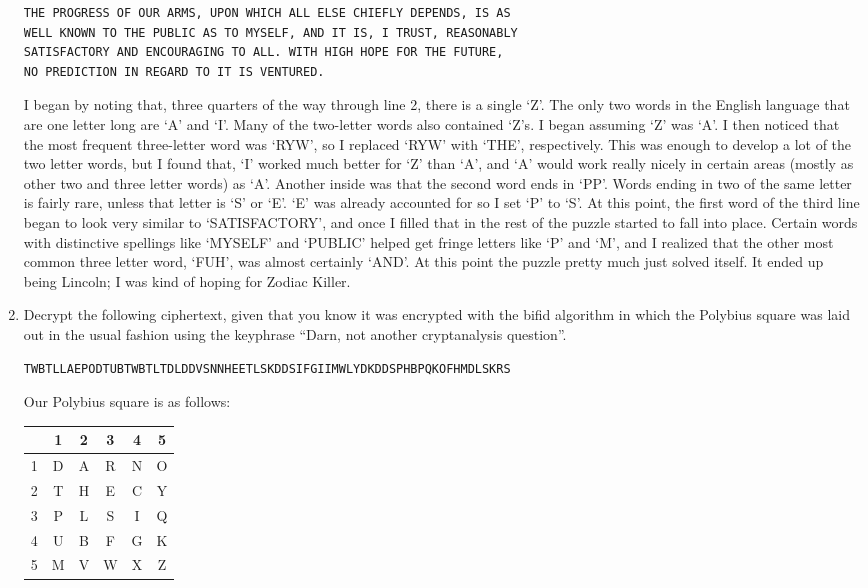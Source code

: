\documentclass[a4paper,12pt]{article}
\begin{document}
\begin{enumerate}
\begin{verbatim}
THE PROGRESS OF OUR ARMS, UPON WHICH ALL ELSE CHIEFLY DEPENDS, IS AS
WELL KNOWN TO THE PUBLIC AS TO MYSELF, AND IT IS, I TRUST, REASONABLY
SATISFACTORY AND ENCOURAGING TO ALL. WITH HIGH HOPE FOR THE FUTURE, 
NO PREDICTION IN REGARD TO IT IS VENTURED.
\end{verbatim}

I began by noting that, three quarters of the way through line 2, there is a single `Z'. The only two words in the English language that are one letter long are `A' and `I'. Many of the two-letter words also contained `Z's. I began assuming `Z' was `A'. I then noticed that the most frequent three-letter word was `RYW', so I replaced `RYW' with `THE', respectively. This was enough to develop a lot of the two letter words, but I found that, `I' worked much better for `Z' than `A', and `A' would work really nicely in certain areas (mostly as other two and three letter words) as `A'. Another inside was that the second word ends in `PP'. Words ending in two of the same letter is fairly rare, unless that letter is `S' or `E'. `E' was already accounted for so I set `P' to `S'. At this point, the first word of the third line began to look very similar to `SATISFACTORY', and once I filled that in the rest of the puzzle started to fall into place. Certain words with distinctive spellings like `MYSELF' and `PUBLIC' helped get fringe letters like `P' and `M', and I realized that the other most common three letter word, `FUH', was almost certainly `AND'. At this point the puzzle pretty much just solved itself. It ended up being Lincoln; I was kind of hoping for Zodiac Killer.

\item Decrypt the following ciphertext, given that you know it was encrypted with the bifid algorithm in which the Polybius square was laid out in the usual fashion using the keyphrase ``Darn, not another cryptanalysis question''.

\begin{verbatim}
TWBTLLAEPODTUBTWBTLTDLDDVSNNHEETLSKDDSIFGIIMWLYDKDDSPHBPQKOFHMDLSKRS
\end{verbatim}

Our Polybius square is as follows:

\begin{center}
\begin{tabular}{|c|c|c|c|c|c|}
\hline
  & 1 & 2 & 3 & 4 & 5 \\\hline
1 & D & A & R & N & O \\\hline
2 & T & H & E & C & Y \\\hline
3 & P & L & S & I & Q \\\hline
4 & U & B & F & G & K \\\hline
5 & M & V & W & X & Z \\\hline
\end{tabular}


\end{center}
\end{enumerate}
\end{document}
